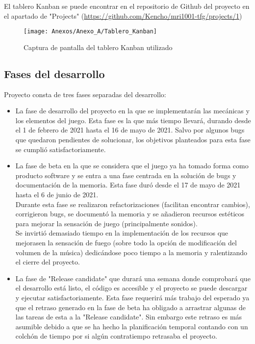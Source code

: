 El tablero Kanban se puede encontrar en el repositorio de Github del proyecto en el apartado de "Projects" (\url{https://github.com/Kencho/mri1001-tfg/projects/1})

\begin{figure}[h]
\centering
\texttt{[image: Anexos/Anexo\_A/Tablero\_Kanban]}
\caption{Captura de pantalla del tablero Kanban utilizado}
\end{figure}
\clearpage

\subsection{Fases del desarrollo}
Proyecto consta de tres fases separadas del desarrollo:
\begin{itemize}
\item
La fase de desarrollo del proyecto en la que se implementarán las mecánicas y los elementos del juego. Esta fase es la que más tiempo llevará, durando desde el 1 de febrero de 2021 hasta el 16 de mayo de 2021. Salvo por algunos bugs que quedaron pendientes de solucionar, los objetivos planteados para esta fase se cumplió satisfactoriamente.
\item
La fase de beta en la que se considera que el juego ya ha tomado forma como producto software y se entra a una fase centrada en la solución de bugs y documentación de la memoria. Esta fase duró desde el 17 de mayo de 2021 hasta el 6 de junio de 2021.\\
Durante esta fase se realizaron refactorizaciones (facilitan encontrar cambios), corrigieron bugs, se documentó la memoria y se añadieron recursos estéticos para mejorar la sensación de juego (principalmente sonidos).\\
Se invirtió demasiado tiempo en la implementación de los recursos que mejorasen la sensación de fuego (sobre todo la opción de modificación del volumen de la música) dedicándose poco tiempo a la memoria y ralentizando el cierre del proyecto.
\item
La fase de "Release candidate" que durará una semana donde comprobará que el desarrollo está listo, el código es accesible y el proyecto se puede descargar y ejecutar satisfactoriamente. Esta fase requerirá más trabajo del esperado ya que el retraso generado en la fase de beta ha obligado a arrastrar algunas de las tareas de esta a la "Release candidate". Sin embargo este retraso es más asumible debido a que se ha hecho la planificación temporal contando con un colchón de tiempo por si algún contratiempo retrasaba el proyecto.
\end{itemize}

